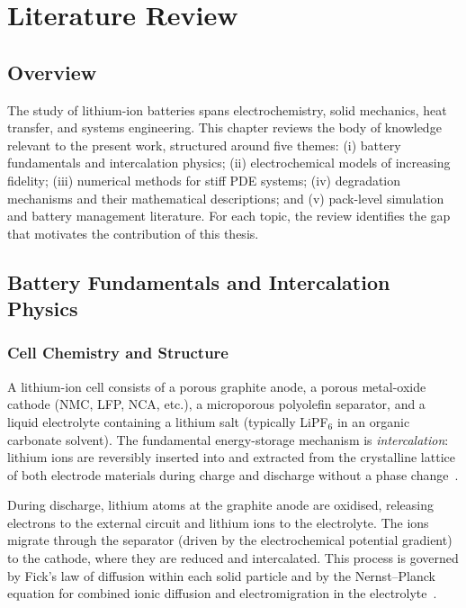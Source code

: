 \chapter{Literature Review}
\label{ch:literature}

\section{Overview}
\label{sec:lit_overview}

The study of lithium-ion batteries spans electrochemistry, solid mechanics, heat transfer, and systems engineering. This chapter reviews the body of knowledge relevant to the present work, structured around five themes: (i) battery fundamentals and intercalation physics; (ii) electrochemical models of increasing fidelity; (iii) numerical methods for stiff PDE systems; (iv) degradation mechanisms and their mathematical descriptions; and (v) pack-level simulation and battery management literature. For each topic, the review identifies the gap that motivates the contribution of this thesis.

\section{Battery Fundamentals and Intercalation Physics}
\label{sec:lit_fundamentals}

\subsection{Cell Chemistry and Structure}
\label{ssec:lit_cell_chemistry}

A lithium-ion cell consists of a porous graphite anode, a porous metal-oxide cathode (NMC, LFP, NCA, etc.), a microporous polyolefin separator, and a liquid electrolyte containing a lithium salt (typically LiPF$_6$ in an organic carbonate solvent). The fundamental energy-storage mechanism is \emph{intercalation}: lithium ions are reversibly inserted into and extracted from the crystalline lattice of both electrode materials during charge and discharge without a phase change~\cite{Goodenough2013,Whittingham2004}.

During discharge, lithium atoms at the graphite anode are oxidised, releasing electrons to the external circuit and lithium ions to the electrolyte. The ions migrate through the separator (driven by the electrochemical potential gradient) to the cathode, where they are reduced and intercalated. This process is governed by Fick's law of diffusion within each solid particle and by the Nernst--Planck equation for combined ionic diffusion and electromigration in the electrolyte~\cite{Newman2004}.

